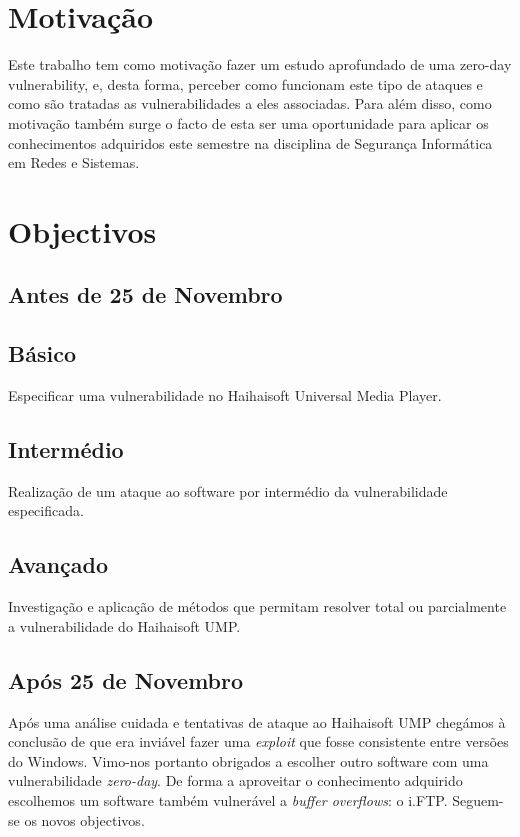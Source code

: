 \documentclass[a4paper]{article}
\begin{document}


\tableofcontents
\pagebreak

\section{Motivação}
Este trabalho tem como motivação fazer um estudo aprofundado de uma zero-day vulnerability, e, desta forma, perceber como funcionam este tipo de ataques e como são tratadas as vulnerabilidades a eles associadas. Para além disso, como motivação também surge o facto de esta ser uma oportunidade para aplicar os conhecimentos adquiridos este semestre na disciplina de Segurança Informática em Redes e Sistemas.

\pagebreak
\section{Objectivos}
\label{sec:objectivos}

\subsection{Antes de 25 de Novembro}

\subsection*{Básico}
Especificar uma vulnerabilidade no Haihaisoft Universal Media Player.
\subsection*{Intermédio}
Realização de um ataque ao software por intermédio da vulnerabilidade especificada.
\subsection*{Avançado}
Investigação e aplicação de métodos que permitam resolver total ou parcialmente a vulnerabilidade do Haihaisoft UMP.

\subsection{Após 25 de Novembro}
Após uma análise cuidada e tentativas de ataque ao Haihaisoft UMP chegámos à conclusão de que era inviável fazer uma \textit{exploit} que fosse consistente entre versões do Windows. Vimo-nos portanto obrigados a escolher outro software com uma vulnerabilidade \textit{zero-day}. De forma a aproveitar o conhecimento adquirido escolhemos um software também vulnerável a \textit{buffer overflows}: o i.FTP. Seguem-se os novos objectivos.
\end{document}
